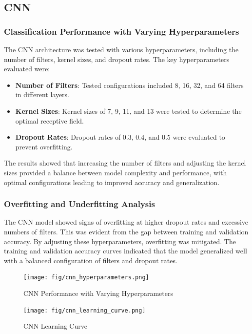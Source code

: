 \subsection{CNN}
\subsubsection{Classification Performance with Varying Hyperparameters}
The CNN architecture was tested with various hyperparameters, including the number of filters, kernel sizes, and dropout rates. The key hyperparameters evaluated were:
\begin{itemize}
    \item \textbf{Number of Filters}: Tested configurations included 8, 16, 32, and 64 filters in different layers.
    \item \textbf{Kernel Sizes}: Kernel sizes of 7, 9, 11, and 13 were tested to determine the optimal receptive field.
    \item \textbf{Dropout Rates}: Dropout rates of 0.3, 0.4, and 0.5 were evaluated to prevent overfitting.
\end{itemize}
The results showed that increasing the number of filters and adjusting the kernel sizes provided a balance between model complexity and performance, with optimal configurations leading to improved accuracy and generalization.

\subsubsection{Overfitting and Underfitting Analysis}
The CNN model showed signs of overfitting at higher dropout rates and excessive numbers of filters. This was evident from the gap between training and validation accuracy. By adjusting these hyperparameters, overfitting was mitigated. The training and validation accuracy curves indicated that the model generalized well with a balanced configuration of filters and dropout rates.

\begin{figure}[!ht]
    \centering
    \texttt{[image: fig/cnn\_hyperparameters.png]}
    \vspace{-0.3cm}
    \caption{CNN Performance with Varying Hyperparameters}
    \label{fig:cnn_hyperparameters}
    \vspace{-0.1cm}
\end{figure}

\begin{figure}[!ht]
    \centering
    \texttt{[image: fig/cnn\_learning\_curve.png]}
    \vspace{-0.3cm}
    \caption{CNN Learning Curve}
    \label{fig:cnn_learning_curve}
    \vspace{-0.1cm}
\end{figure}


